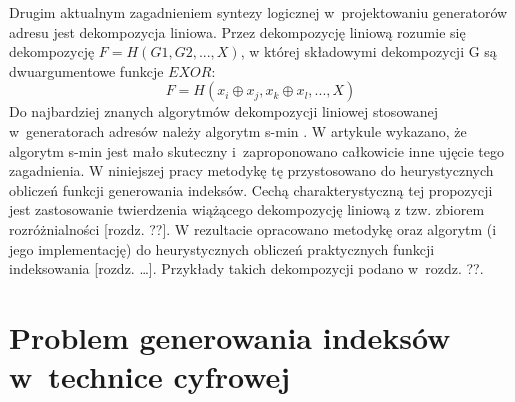 Drugim aktualnym zagadnieniem syntezy logicznej w~projektowaniu generatorów adresu jest dekompozycja liniowa.
Przez dekompozycję liniową rozumie się dekompozycję $F = H(G1, G2, ...,  X)$,
w której składowymi dekompozycji G są dwuargumentowe funkcje $EXOR$:
\begin{equation}
F = H (x_i \oplus x_j, x_k \oplus x_l, ..., X)
\end{equation}
Do najbardziej znanych algorytmów dekompozycji liniowej stosowanej w~generatorach adresów należy algorytm s-min \cite{sasao-recent, sasao-s-min}.
W artykule \cite{redukcja-kompresja} wykazano, że algorytm s-min jest mało skuteczny i~zaproponowano całkowicie inne ujęcie tego zagadnienia.
W niniejszej pracy metodykę tę przystosowano do heurystycznych obliczeń funkcji generowania indeksów.
Cechą charakterystyczną tej propozycji jest zastosowanie twierdzenia wiążącego dekompozycję liniową z tzw. zbiorem rozróżnialności [rozdz. ??].
W rezultacie opracowano metodykę oraz algorytm (i jego implementację) do heurystycznych obliczeń praktycznych funkcji indeksowania [rozdz. …].
Przykłady takich dekompozycji podano w~rozdz. ??.

\section{Problem generowania indeksów w~technice cyfrowej}

